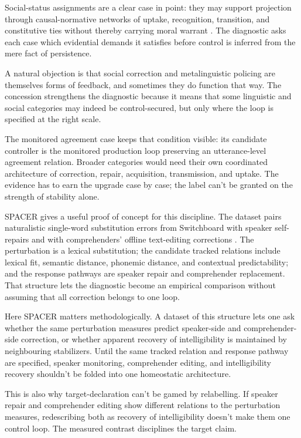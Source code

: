 \documentclass[12pt]{article}
\begin{document}
Social-status assignments are a clear case in point: they may support projection
through causal-normative networks of uptake, recognition, transition, and
constitutive ties without thereby carrying moral warrant
\citep{reynolds2026effective}. The diagnostic asks each case which evidential
demands it satisfies before control is inferred from the mere fact of persistence.

A natural objection is that social correction and metalinguistic policing are
themselves forms of feedback, and sometimes they do function that way. The
concession strengthens the diagnostic because it means that some linguistic and
social categories may indeed be control-secured, but only where the loop is
specified at the right scale.

The monitored agreement case keeps that condition visible: its candidate
controller is the monitored production loop preserving an utterance-level
agreement relation. Broader categories would need their own coordinated
architecture of correction, repair, acquisition, transmission, and uptake. The
evidence has to earn the upgrade case by case; the label can't be granted on the
strength of stability alone.

SPACER gives a useful proof of concept for this discipline. The dataset pairs
naturalistic single-word substitution errors from Switchboard with speaker
self-repairs and with comprehenders' offline text-editing corrections
\citep{upadhyeEtAl2025spacer}. The perturbation is a lexical substitution; the
candidate tracked relations include lexical fit, semantic distance, phonemic
distance, and contextual predictability; and the response pathways are speaker
repair and comprehender replacement. That structure lets the diagnostic become an
empirical comparison without assuming that all correction belongs to one loop.

Here SPACER matters methodologically. A dataset of this structure lets one ask
whether the same perturbation measures predict speaker-side and comprehender-side
correction, or whether apparent recovery of intelligibility is maintained by
neighbouring stabilizers. Until the same tracked relation and response pathway are
specified, speaker monitoring, comprehender editing, and intelligibility recovery
shouldn't be folded into one homeostatic architecture.

This is also why target-declaration can't be gamed by relabelling. If speaker
repair and comprehender editing show different relations to the perturbation
measures, redescribing both as recovery of intelligibility doesn't make them one
control loop. The measured contrast disciplines the target claim.
\end{document}

